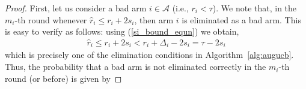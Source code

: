\begin{proof}
First, let us consider a bad arm $i\in\mathcal{A}$ (i.e., $r_i<\tau$). We note that, in the $m_i$-th round  whenever 
$\hat{r}_i \le r_i +2s_i$, then arm $i$ is eliminated as a bad arm. This is easy to verify as follows: using (\ref{si_bound_equn}) we obtain,
\begin{align*}
\hat{r}_{i}\leq r_{i} + 2s_{i} 
< r_{i} + \Delta_{i} - 2s_{i} 
= \tau - 2s_{i} %
\end{align*}
which is precisely one of the elimination conditions in Algorithm~\ref{alg:augucb}. Thus, the probability that a bad arm is not eliminated correctly in the $m_i$-th round (or before) is given by

%
%
%
%
%
%
%
%








\end{proof}
